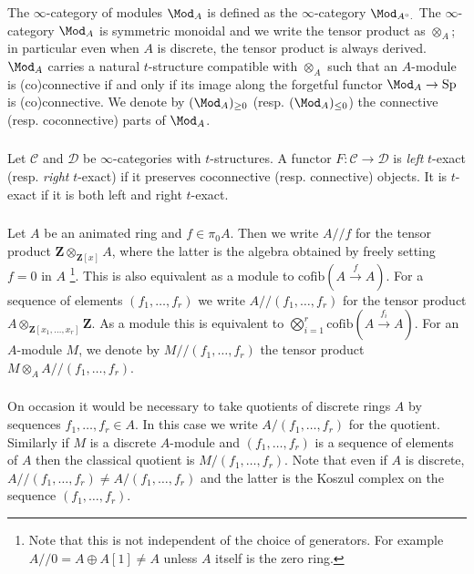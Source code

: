 \documentclass[10pt,reqno]{amsart}
\numberwithin{equation}{section}
\newcommand{\cD}{{\mathcal{D}}}
\newcommand{\cC}{\mathcal{C}}
\newcommand{\ZZ}{\mathbf{Z}}
\newcommand{\cofib}{\mathrm{cofib}}
\begin{document}
\subsubsection{}
The $\infty$-category of modules $\Mod_A$ is defined as the $\infty$-category $\Mod_{A^\circ.}$
The $\infty$-category $\Mod_A$ is symmetric monoidal and we write the tensor product as $\otimes_A$; in particular even when $A$ is discrete, the tensor product is always derived. $\Mod_A$ carries a natural $t$-structure compatible with $\otimes_A$ such that an $A$-module is (co)connective if and only if its image along the forgetful functor $\Mod_A\to \mathrm{Sp}$ is (co)connective. We denote by $(\Mod_A)_{\geq 0}$ (resp. $(\Mod_A)_{\leq 0}$) the connective (resp. coconnective) parts of $\Mod_A$. 

\subsubsection{} Let $\cC$ and $\cD$ be $\infty$-categories with $t$-structures. A functor $F\colon \cC\to \cD$ is \emph{left} $t$-exact (resp. \emph{right} $t$-exact) if it preserves coconnective (resp. connective) objects. It is $t$-exact if it is both left and right $t$-exact.


\subsubsection{}\label{quotients} Let $A$ be an animated ring and $f\in \pi_0A$. Then we write $A/\!\!/f$ for the tensor product $\ZZ\otimes_{\ZZ[x]} A$, where the latter is the algebra obtained by freely setting $f=0$ in $A$ \footnote{Note that this is not independent of the choice of generators. For example $A/\!\!/0=A\oplus A[1]\neq A$ unless $A$ itself is the zero ring.}. This is also equivalent as a module to $\cofib(A\xrightarrow{f} A).$ For a sequence of elements $(f_1,\ldots, f_r)$ we write $A/\!\!/(f_1,\ldots, f_r)$ for the tensor product $A \otimes_{\ZZ[x_1,\ldots,x_r]} \ZZ$. As a module this is equivalent to $\bigotimes_{i=1}^r \cofib(A\xrightarrow{f_i}A).$ For an $A$-module $M$, we denote by $M/\!\!/(f_1,\ldots, f_r)$ the tensor product $M\otimes_A A/\!\!/(f_1,\ldots, f_r).$

\subsubsection{}
On occasion it would be necessary to take quotients of discrete rings $A$ by sequences $f_1,\ldots, f_r\in A$. In this case we write $A/(f_1,\ldots, f_r)$ for the quotient. Similarly if $M$ is a discrete $A$-module and $(f_1,\ldots, f_r)$ is a sequence of elements of $A$ then the classical quotient is $M/(f_1,\ldots, f_r).$ Note that even if $A$ is discrete, $A/\!\!/(f_1,\ldots, f_r)\neq A/(f_1,\ldots, f_r)$ and the latter is the Koszul complex on the sequence $(f_1,\ldots, f_r).$
\end{document}
